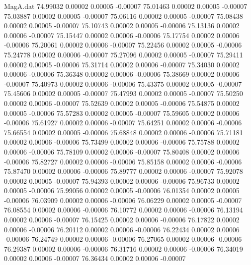 \begin{filecontents}{MagA.dat}
  74.99032    0.00002    0.00005   -0.00007
  75.01463    0.00002    0.00005   -0.00007
  75.03887    0.00002    0.00005   -0.00007
  75.06116    0.00002    0.00005   -0.00007
  75.08438    0.00002    0.00005   -0.00007
  75.10743    0.00002    0.00005   -0.00006
  75.13136    0.00002    0.00006   -0.00007
  75.15447    0.00002    0.00006   -0.00006
  75.17754    0.00002    0.00006   -0.00006
  75.20061    0.00002    0.00006   -0.00007
  75.22456    0.00002    0.00005   -0.00006
  75.24778    0.00002    0.00006   -0.00007
  75.27096    0.00002    0.00005   -0.00007
  75.29411    0.00002    0.00005   -0.00006
  75.31714    0.00002    0.00006   -0.00007
  75.34030    0.00002    0.00006   -0.00006
  75.36348    0.00002    0.00006   -0.00006
  75.38669    0.00002    0.00006   -0.00007
  75.40973    0.00002    0.00006   -0.00006
  75.43375    0.00002    0.00005   -0.00007
  75.45606    0.00002    0.00005   -0.00007
  75.47993    0.00002    0.00005   -0.00007
  75.50250    0.00002    0.00006   -0.00007
  75.52639    0.00002    0.00005   -0.00006
  75.54875    0.00002    0.00005   -0.00006
  75.57283    0.00002    0.00005   -0.00007
  75.59605    0.00002    0.00006   -0.00006
  75.61927    0.00002    0.00006   -0.00007
  75.64251    0.00002    0.00006   -0.00006
  75.66554    0.00002    0.00005   -0.00006
  75.68848    0.00002    0.00006   -0.00006
  75.71181    0.00002    0.00006   -0.00006
  75.73499    0.00002    0.00006   -0.00006
  75.75788    0.00002    0.00006   -0.00006
  75.78109    0.00002    0.00006   -0.00007
  75.80408    0.00002    0.00006   -0.00006
  75.82727    0.00002    0.00006   -0.00006
  75.85158    0.00002    0.00006   -0.00006
  75.87470    0.00002    0.00006   -0.00006
  75.89777    0.00002    0.00006   -0.00007
  75.92078    0.00002    0.00005   -0.00007
  75.94393    0.00002    0.00006   -0.00006
  75.96733    0.00002    0.00005   -0.00006
  75.99056    0.00002    0.00005   -0.00006
  76.01354    0.00002    0.00005   -0.00006
  76.03909    0.00002    0.00006   -0.00006
  76.06229    0.00002    0.00005   -0.00007
  76.08554    0.00002    0.00006   -0.00006
  76.10772    0.00002    0.00006   -0.00006
  76.13194    0.00002    0.00006   -0.00007
  76.15425    0.00002    0.00006   -0.00006
  76.17822    0.00002    0.00006   -0.00006
  76.20112    0.00002    0.00006   -0.00006
  76.22434    0.00002    0.00006   -0.00006
  76.24749    0.00002    0.00006   -0.00006
  76.27065    0.00002    0.00006   -0.00006
  76.29387    0.00002    0.00006   -0.00006
  76.31716    0.00002    0.00006   -0.00006
  76.34019    0.00002    0.00006   -0.00007
  76.36434    0.00002    0.00006   -0.00007

\end{filecontents}
